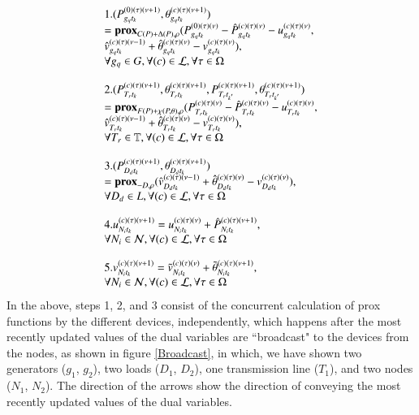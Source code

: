 \documentclass[preprint,12pt,3p]{elsarticle}
\begin{document}
\begin{equation}\label{Prox_Lookahead_Demand}
\begin{array}{ll}
1.(P_{{g_q}{t_k}}^{(0)(\tau)(\nu+1)},\theta_{{g_q}{t_k}}^{(c)(\tau)(\nu+1)})\notag\\=\mathbf{prox}_{C(P)+\Delta(P),\rho}(P_{{g_q}{t_k}}^{(0)(\tau)(\nu)}-\hat{P}_{{g_q}{t_k}}^{(c)(\tau)(\nu)}-u_{{g_q}{t_k}}^{(c)(\tau)(\nu)},\\ \hat{v}_{{g_q}{t_k}}^{(c)(\tau)(\nu-1)}+\hat{\theta}_{{g_q}{t_k}}^{(c)(\tau)(\nu)}-v_{{g_q}{t_k}}^{(c)(\tau)(\nu)}),\\\forall g_q\in G,\forall(c)\in\mathcal{L},\forall\tau\in\Omega\\
\\
2.(P_{{T_r}{t_k}}^{(c)(\tau)(\nu+1)},\theta_{{T_r}{t_k}}^{(c)(\tau)(\nu+1)},P_{{T_r}{t_{k^{'}}}}^{(c)(\tau)(\nu+1)},\theta_{{T_r}{t_{k^{'}}}}^{(c)(\tau)(\nu+1)})\notag\\=\mathbf{prox}_{F(P)+\chi(P,\theta),\rho}(P_{{T_r}{t_k}}^{(c)(\tau)(\nu)}-\hat{P}_{{T_r}{t_k}}^{(c)(\tau)(\nu)}-u_{{T_r}{t_k}}^{(c)(\tau)(\nu)}, \\\hat{v}_{{T_r}{t_k}}^{(c)(\tau)(\nu-1)}+\hat{\theta}_{{T_r}{t_k}}^{(c)(\tau)(\nu)}-v_{{T_r}{t_k}}^{(c)(\tau)(\nu)}),
\\\forall T_r\in \mathbb{T},\forall(c)\in\mathcal{L},\forall\tau\in\Omega\\
\\
3.(P_{{D_d}{t_k}}^{(c)(\tau)(\nu+1)},\theta_{{D_d}{t_k}}^{(c)(\tau)(\nu+1)})\notag\\=\mathbf{prox}_{-D,\rho}(\hat{v}_{{D_d}{t_k}}^{(c)(\tau)(\nu-1)}+\hat{\theta}_{{D_d}{t_k}}^{(c)(\tau)(\nu)}-v_{{D_d}{t_k}}^{(c)(\tau)(\nu)}),\\\forall D_d\in L,\forall(c)\in\mathcal{L},\forall\tau\in\Omega\\
\\
4.u_{{N_i}{t_k}}^{(c)(\tau)(\nu+1)}=u_{{N_i}{t_k}}^{(c)(\tau)(\nu)}+\hat{P}_{{N_i}{t_k}}^{(c)(\tau)(\nu+1)},\\\forall N_i\in\mathcal{N},\forall(c)\in\mathcal{L},\forall\tau\in\Omega\\
\\
5.v_{{N_i}{t_k}}^{(c)(\tau)(\nu+1)}=\tilde{v}_{{N_i}{t_k}}^{(c)(\tau)(\nu)}+\tilde{\theta}_{{N_i}{t_k}}^{(c)(\tau)(\nu+1)},\\\forall N_i\in\mathcal{N},\forall(c)\in\mathcal{L},\forall\tau\in\Omega
\end{array}
\end{equation}
In the above, steps 1, 2, and 3 consist of the concurrent calculation of prox functions by the different devices, independently, which happens after the most recently updated values of the dual variables are ``broadcast" to the devices from the nodes, as shown in figure \ref{Broadcast}, in which, we have shown two generators ($g_1$, $g_2$), two loads ($D_1$, $D_2$), one transmission line ($T_1$), and two nodes ($N_1$, $N_2$). The direction of the arrows show the direction of conveying the most recently updated values of the dual variables.
\end{document}
